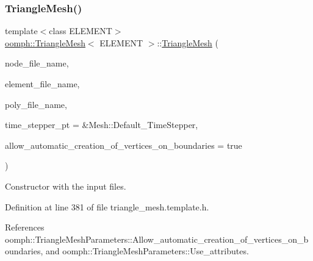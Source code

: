 \mbox{\label{classoomph_1_1TriangleMesh_acb4a658f29866da64cfd31daa98827dc}} 
\subsubsection{\texorpdfstring{Triangle\+Mesh()}{TriangleMesh()}\hspace{0.1cm}{\footnotesize\ttfamily [2/5]}}
{\footnotesize\ttfamily template$<$class E\+L\+E\+M\+E\+NT$>$ \\
\hyperlink{classoomph_1_1TriangleMesh}{oomph\+::\+Triangle\+Mesh}$<$ E\+L\+E\+M\+E\+NT $>$\+::\hyperlink{classoomph_1_1TriangleMesh}{Triangle\+Mesh} (\begin{DoxyParamCaption}\item[{const std\+::string \&}]{node\+\_\+file\+\_\+name,  }\item[{const std\+::string \&}]{element\+\_\+file\+\_\+name,  }\item[{const std\+::string \&}]{poly\+\_\+file\+\_\+name,  }\item[{Time\+Stepper $\ast$}]{time\+\_\+stepper\+\_\+pt = {\ttfamily \&Mesh\+:\+:Default\+\_\+TimeStepper},  }\item[{const bool \&}]{allow\+\_\+automatic\+\_\+creation\+\_\+of\+\_\+vertices\+\_\+on\+\_\+boundaries = {\ttfamily true} }\end{DoxyParamCaption})\hspace{0.3cm}{\ttfamily [inline]}}



Constructor with the input files. 



Definition at line 381 of file triangle\+\_\+mesh.\+template.\+h.



References oomph\+::\+Triangle\+Mesh\+Parameters\+::\+Allow\+\_\+automatic\+\_\+creation\+\_\+of\+\_\+vertices\+\_\+on\+\_\+boundaries, and oomph\+::\+Triangle\+Mesh\+Parameters\+::\+Use\+\_\+attributes.

\mbox{\label{classoomph_1_1TriangleMesh_a9178e41a6f4af03bbb6b304ac3c201aa}} 
